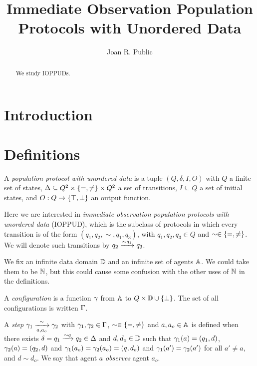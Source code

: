 \documentclass[a4paper,UKenglish,cleveref, autoref, thm-restate]{lipics-v2021}
\title{Immediate Observation Population Protocols with Unordered Data}
\author{Joan R. Public}{Department of Informatics, Dummy College, Country}{joanrpublic@dummycollege.org}{}{}
\begin{document}
	
	\maketitle
	
	
	\begin{abstract}
		We study IOPPUDs.
	\end{abstract}
	
	\section{Introduction}
	
	\section{Definitions}
	
	\begin{definition}
		A \emph{population protocol with unordered data} is a tuple $(Q, \delta, I, O)$ with $Q$ a finite set of states,
		$\Delta \subseteq Q^2 \times \{=, \neq\} \times Q^2$ a set of transitions,
		$I \subseteq Q$ a set of initial states, and
		$O : Q \to \{\top, \bot\}$ an output function.
		
		Here we are interested in \emph{immediate observation population protocols with unordered data} (IOPPUD), which is the subclass of protocols in which every transition is of the form $(q_1, q_2, \sim, q_1, q_3)$, with $q_1, q_2, q_3 \in Q$ and $\sim \in \{=, \neq\}$.
		We will denote such transitions by $q_2 \xrightarrow{\sim q_1} q_3$.
	\end{definition}
	
	We fix an infinite data domain $\mathbb{D}$ and an infinite set of agents $\mathbb{A}$. We could take them to be $\mathbb{N}$, but this could cause some confusion with the other uses of $\mathbb{N}$ in the definitions.
	
	A \emph{configuration} is a function $\gamma$ from $\mathbb{A}$ to $Q \times \mathbb{D} \cup \{\bot\}$. The set of all configurations is written $\Gamma$.
	
	A \emph{step} $\gamma_1 \xrightarrow[a, a_o]{\sim} \gamma_2$ with $\gamma_1, \gamma_2 \in \Gamma$, $\sim \in \{=, \neq\}$ and $a, a_o \in \mathbb{A}$ is defined when there exists  $\delta = q_1 \xrightarrow{\sim q} q_2 \in \Delta$ and $d, d_o \in \mathbb{D}$ such that $\gamma_1(a) = (q_1, d)$, $\gamma_2(a) = (q_2, d)$ and $\gamma_1(a_o) = \gamma_2(a_o) = (q, d_o)$ and $\gamma_1(a') = \gamma_2(a')$ for all $a' \neq a$, and $d \sim d_o$.
	We say that agent $a$ \emph{observes} agent $a_o$. 
	
\end{document}
